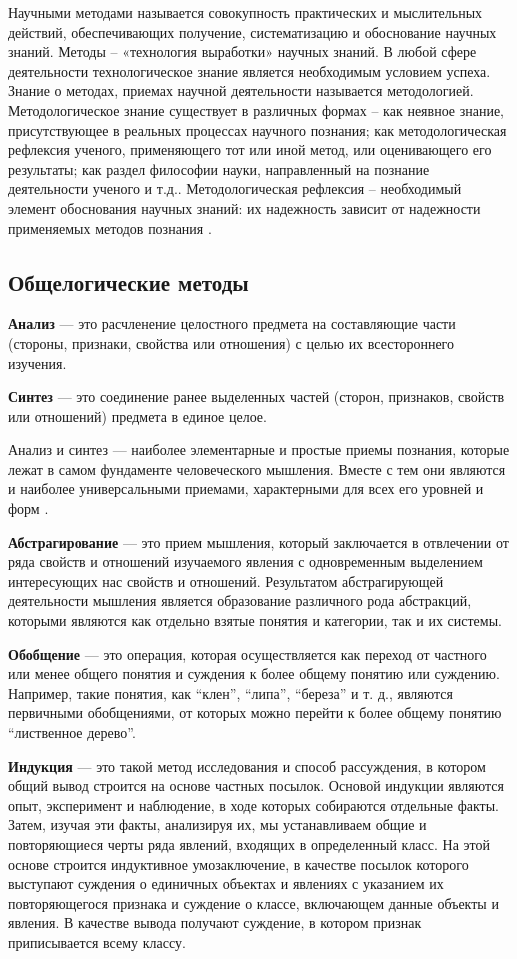 Научными методами называется совокупность практических и мыслительных действий, обеспечивающих получение, систематизацию и обоснование научных знаний. Методы – «технология выработки» научных знаний. В любой сфере деятельности технологическое знание является необходимым условием успеха. Знание о методах, приемах научной деятельности называется методологией. Методологическое знание существует в различных формах – как неявное знание, присутствующее в реальных процессах научного познания; как методологическая рефлексия ученого, применяющего тот или иной метод, или оценивающего его результаты; как раздел философии науки, направленный на познание деятельности ученого и т.д.. Методологическая рефлексия – необходимый элемент обоснования научных знаний: их надежность зависит от надежности применяемых методов познания \cite{stud:methods}.

\subsection{Общелогические методы}

\textbf{Анализ} --- это расчленение целостного предмета на составляющие части (стороны, признаки, свойства или отношения) с целью их всестороннего изучения.

\textbf{Синтез} --- это соединение ранее выделенных частей (сторон, признаков, свойств или отношений) предмета в единое целое.

Анализ и синтез --- наиболее элементарные и простые приемы познания, которые лежат в самом фундаменте человеческого мышления. Вместе с тем они являются и наиболее универсальными приемами, характерными для всех его уровней и форм \cite{mir:philosophy}.

\textbf{Абстрагирование} --- это прием мышления, который заключается в отвлечении от ряда свойств и отношений изучаемого явления с одновременным выделением интересующих нас свойств и отношений. Результатом абстрагирующей деятельности мышления является образование различного рода абстракций, которыми являются как отдельно взятые понятия и категории, так и их системы.

\textbf{Обобщение} --- это операция, которая осуществляется как переход от частного или менее общего понятия и суждения к более общему понятию или суждению. Например, такие понятия, как ``клен'', ``липа'', ``береза'' и т. д., являются первичными обобщениями, от которых можно перейти к более общему понятию ``лиственное дерево''.

\textbf{Индукция} --- это такой метод исследования и способ рассуждения, в котором общий вывод строится на основе частных посылок. Основой индукции являются опыт, эксперимент и наблюдение, в ходе которых собираются отдельные факты. Затем, изучая эти факты, анализируя их, мы устанавливаем общие и повторяющиеся черты ряда явлений, входящих в определенный класс. На этой основе строится индуктивное умозаключение, в качестве посылок которого выступают суждения о единичных объектах и явлениях с указанием их повторяющегося признака и суждение о классе, включающем данные объекты и явления. В качестве вывода получают суждение, в котором признак приписывается всему классу.

